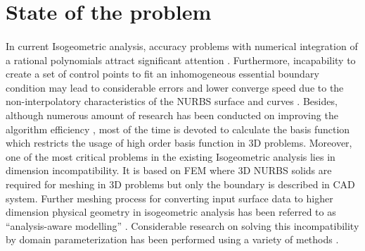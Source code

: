 \section{State of the problem}
\label{intro_sec:problem}
\paragraph{}
In current Isogeometric analysis, accuracy problems with numerical integration of a rational polynomials attract significant attention \citep{Hug2010,Sev2011,Aur2012}.
Furthermore, incapability to create a set of control points to fit an inhomogeneous essential boundary condition may lead to considerable errors and lower converge speed due to the non-interpolatory characteristics of the NURBS surface and curves \citep{Wang2010,Wol2011,Koo2013}.
Besides, although numerous amount of research has been conducted on improving the algorithm efficiency \citep{Boo1972,Qin1996,Cho1990,Gra1992,Pan2001,Wang2012}, most of the time is devoted to calculate the basis function which restricts the usage of high order basis function in 3D problems.
Moreover, one of the most critical problems in the existing Isogeometric analysis lies in dimension incompatibility.
It is based on FEM where 3D NURBS solids are required for meshing in 3D problems but only the boundary is described in CAD system.
Further meshing process for converting input surface data to higher dimension physical geometry in isogeometric analysis has been referred to as ``analysis-aware modelling'' \citep{Coh2010}.
Considerable research on solving this incompatibility by domain parameterization has been performed using a variety of methods \citep{Yang2007,Aig2009,Mar2009,Qian2011}.

